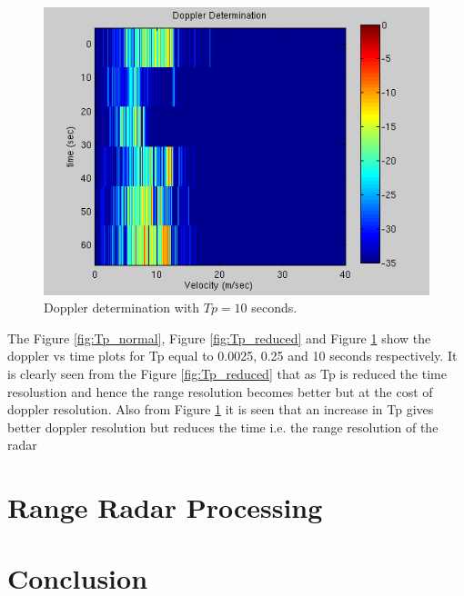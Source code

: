 \documentclass{article}
\begin{document}
\begin{figure}[ht]
\begin{minipage}[b]{0.33\linewidth}
\includegraphics[width=\textwidth]{Figures/Tp_increased.png}
\caption{Doppler determination with $Tp = 10$ seconds.}
\label{fig:Tp_increased}
\end{minipage}
\end{figure}

The Figure \ref{fig:Tp_normal}, Figure \ref{fig:Tp_reduced} and Figure \ref{fig:Tp_increased} show the doppler vs time plots for Tp equal to 0.0025, 0.25 and 10 seconds respectively. It is clearly seen from the Figure \ref{fig:Tp_reduced} that as Tp is reduced the time resolustion and hence the range resolution becomes better but at the cost of doppler resolution. Also from Figure \ref{fig:Tp_increased} it is seen that an increase in Tp gives better doppler resolution but reduces the time i.e. the range resolution of the radar


\section{Range Radar Processing}

\section{Conclusion}
\end{document}
